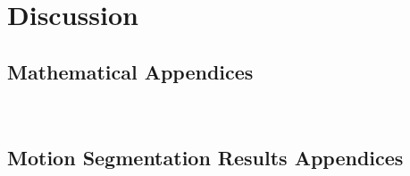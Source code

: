 \documentclass[
  12pt, 
  draft
]{book}
\begin{document}
\chapter{Discussion}


\begin{appendices}
  \section{Mathematical Appendices}
~\label{appendix:mathematical}


  \section{Motion Segmentation Results Appendices}
~\label{appendix:moseg_additional_results}
  
\end{appendices}


\end{document}
